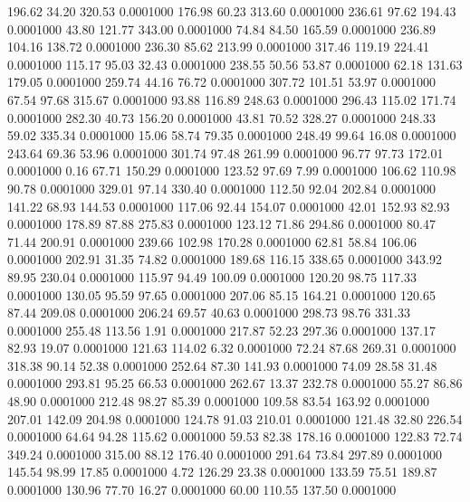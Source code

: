  196.62   34.20  320.53   0.0001000
 176.98   60.23  313.60   0.0001000
 236.61   97.62  194.43   0.0001000
  43.80  121.77  343.00   0.0001000
  74.84   84.50  165.59   0.0001000
 236.89  104.16  138.72   0.0001000
 236.30   85.62  213.99   0.0001000
 317.46  119.19  224.41   0.0001000
 115.17   95.03   32.43   0.0001000
 238.55   50.56   53.87   0.0001000
  62.18  131.63  179.05   0.0001000
 259.74   44.16   76.72   0.0001000
 307.72  101.51   53.97   0.0001000
  67.54   97.68  315.67   0.0001000
  93.88  116.89  248.63   0.0001000
 296.43  115.02  171.74   0.0001000
 282.30   40.73  156.20   0.0001000
  43.81   70.52  328.27   0.0001000
 248.33   59.02  335.34   0.0001000
  15.06   58.74   79.35   0.0001000
 248.49   99.64   16.08   0.0001000
 243.64   69.36   53.96   0.0001000
 301.74   97.48  261.99   0.0001000
  96.77   97.73  172.01   0.0001000
   0.16   67.71  150.29   0.0001000
 123.52   97.69    7.99   0.0001000
 106.62  110.98   90.78   0.0001000
 329.01   97.14  330.40   0.0001000
 112.50   92.04  202.84   0.0001000
 141.22   68.93  144.53   0.0001000
 117.06   92.44  154.07   0.0001000
  42.01  152.93   82.93   0.0001000
 178.89   87.88  275.83   0.0001000
 123.12   71.86  294.86   0.0001000
  80.47   71.44  200.91   0.0001000
 239.66  102.98  170.28   0.0001000
  62.81   58.84  106.06   0.0001000
 202.91   31.35   74.82   0.0001000
 189.68  116.15  338.65   0.0001000
 343.92   89.95  230.04   0.0001000
 115.97   94.49  100.09   0.0001000
 120.20   98.75  117.33   0.0001000
 130.05   95.59   97.65   0.0001000
 207.06   85.15  164.21   0.0001000
 120.65   87.44  209.08   0.0001000
 206.24   69.57   40.63   0.0001000
 298.73   98.76  331.33   0.0001000
 255.48  113.56    1.91   0.0001000
 217.87   52.23  297.36   0.0001000
 137.17   82.93   19.07   0.0001000
 121.63  114.02    6.32   0.0001000
  72.24   87.68  269.31   0.0001000
 318.38   90.14   52.38   0.0001000
 252.64   87.30  141.93   0.0001000
  74.09   28.58   31.48   0.0001000
 293.81   95.25   66.53   0.0001000
 262.67   13.37  232.78   0.0001000
  55.27   86.86   48.90   0.0001000
 212.48   98.27   85.39   0.0001000
 109.58   83.54  163.92   0.0001000
 207.01  142.09  204.98   0.0001000
 124.78   91.03  210.01   0.0001000
 121.48   32.80  226.54   0.0001000
  64.64   94.28  115.62   0.0001000
  59.53   82.38  178.16   0.0001000
 122.83   72.74  349.24   0.0001000
 315.00   88.12  176.40   0.0001000
 291.64   73.84  297.89   0.0001000
 145.54   98.99   17.85   0.0001000
   4.72  126.29   23.38   0.0001000
 133.59   75.51  189.87   0.0001000
 130.96   77.70   16.27   0.0001000
  60.00  110.55  137.50   0.0001000
